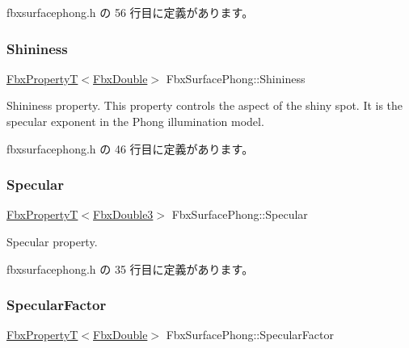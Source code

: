  fbxsurfacephong.\+h の 56 行目に定義があります。

\mbox{\label{class_fbx_surface_phong_ae92be9749116e7eedecb2447b6401d7d}} 
\subsubsection{\texorpdfstring{Shininess}{Shininess}}
{\footnotesize\ttfamily \hyperlink{class_fbx_property_t}{Fbx\+PropertyT}$<$\hyperlink{fbxtypes_8h_a171e72a1c46fc15c1a6c9c31948c1c5b}{Fbx\+Double}$>$ Fbx\+Surface\+Phong\+::\+Shininess}

Shininess property. This property controls the aspect of the shiny spot. It is the specular exponent in the Phong illumination model. 

 fbxsurfacephong.\+h の 46 行目に定義があります。

\mbox{\label{class_fbx_surface_phong_a2f845bd60215d282c415e2129034e79e}} 
\subsubsection{\texorpdfstring{Specular}{Specular}}
{\footnotesize\ttfamily \hyperlink{class_fbx_property_t}{Fbx\+PropertyT}$<$\hyperlink{fbxtypes_8h_ae0a96f14cde566774c7553aa7523b7a7}{Fbx\+Double3}$>$ Fbx\+Surface\+Phong\+::\+Specular}



Specular property. 



 fbxsurfacephong.\+h の 35 行目に定義があります。

\mbox{\label{class_fbx_surface_phong_a821efe9075d1d6ee22d3ab72ab303eaa}} 
\subsubsection{\texorpdfstring{Specular\+Factor}{SpecularFactor}}
{\footnotesize\ttfamily \hyperlink{class_fbx_property_t}{Fbx\+PropertyT}$<$\hyperlink{fbxtypes_8h_a171e72a1c46fc15c1a6c9c31948c1c5b}{Fbx\+Double}$>$ Fbx\+Surface\+Phong\+::\+Specular\+Factor}

